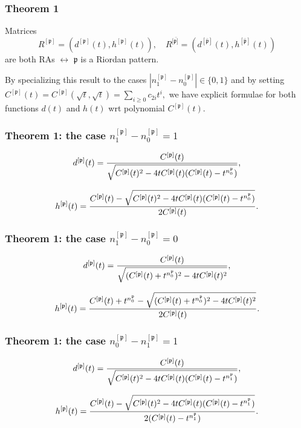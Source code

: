 \documentclass{beamer}
\begin{document}
\begin{frame}\frametitle{Theorem 1}
Matrices 
\begin{displaymath}
{{R}^{[\mathfrak{p}]}}=(d^{[\mathfrak{p}]}(t),h^{[\mathfrak{p}]}(t)), \quad
{{R}^{[\bar{\mathfrak{p}]}}}=(d^{[\bar{\mathfrak{p}}]}(t),h^{[\bar{\mathfrak{p}}]}(t))
\end{displaymath}
are both RAs $\leftrightarrow$  $\mathfrak{p}$ is a Riordan pattern.

\begin{block}{}
By specializing this result  to the cases
$\left|n_1^{[\mathfrak{p}]}-n_0^{[\mathfrak{p}]}\right|\in \{0,1\}$ and by
setting
$C^{[\mathfrak{p}]}(t)=C^{[\mathfrak{p}]}\left(\sqrt{t},\sqrt{t}\right)=\sum_{i
\geq 0}c_{2i}t^i,$ we have explicit formulae for both functions $d(t)$ and $h(t)$
wrt polynomial $C^{[\mathfrak{p}]}(t)$.
\end{block}

\end{frame}

\begin{frame}\frametitle{Theorem 1: the case $n_1^{[\mathfrak{p}]}-n_0^{[\mathfrak{p}]}=1$}
$$d^{[\mathfrak{p}]}(t)={C^{[\mathfrak{p}]}(t)
\over \sqrt{C^{[\mathfrak{p}]}(t)^2-4tC^{[\mathfrak{p}]}(t)(C^{[\mathfrak{p}]}(t)-t^{n_0^{\mathfrak{p}}})}}, $$

$$h^{[\mathfrak{p}]}(t)={C^{[\mathfrak{p}]}(t) -\sqrt{C^{[\mathfrak{p}]}(t)^2-4tC^{[\mathfrak{p}]}(t)(C^{[\mathfrak{p}]}(t)-t^{n_0^{\mathfrak{p}}})}
\over 2 C^{[\mathfrak{p}]}(t)}.$$
\end{frame}

\begin{frame}\frametitle{Theorem 1: the case $n_1^{[\mathfrak{p}]}-n_0^{[\mathfrak{p}]}=0$}
$$d^{[\mathfrak{p}]}(t)={C^{[\mathfrak{p}]}(t)
\over \sqrt{( C^{[\mathfrak{p}]}(t)+t^{n_0^{\mathfrak{p}}})^2-4tC^{[\mathfrak{p}]}(t)^2}}, $$

$$h^{[\mathfrak{p}]}(t)=
{C^{[\mathfrak{p}]}(t)+ t^{n_0^{\mathfrak{p}}} - \sqrt{( C^{[\mathfrak{p}]}(t)+t^{n_0^{\mathfrak{p}}})^2-4tC^{[\mathfrak{p}]}(t)^2} \over 2
C^{[\mathfrak{p}]}(t)}.$$
\end{frame}

\begin{frame}\frametitle{Theorem 1: the case $n_0^{[\mathfrak{p}]}-n_1^{[\mathfrak{p}]}=1$}
$$d^{[\mathfrak{p}]}(t)={C^{[\mathfrak{p}]}(t)
\over \sqrt{C^{[\mathfrak{p}]}(t)^2-4tC^{[\mathfrak{p}]}(t)(C^{[\mathfrak{p}]}(t)-t^{n_1^{\mathfrak{p}}})}}, $$

$$h^{[\mathfrak{p}]}(t)={C^{[\mathfrak{p}]}(t) -\sqrt{C^{[\mathfrak{p}]}(t)^2-4tC^{[\mathfrak{p}]}(t)(C^{[\mathfrak{p}]}(t)-t^{n_1^{\mathfrak{p}}})}
\over 2 (C^{[\mathfrak{p}]}(t)- t^{n_1^{\mathfrak{p}}})}.$$
\end{frame}
\end{document}
